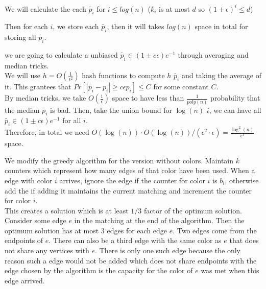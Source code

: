 \documentclass[11pt]{article}%
\begin{document}
\begin{questions}[1]
\begin{enumerate}
\begin{enumerate}
            We will calculate the each $\tilde{p_i}$ for $i \leq log(n)$ ($k_i$ is at most $d$ so $(1+\epsilon)^i\leq d$)
            
            Then for each $i$, we store each $\tilde{p_i}$, then it will takes $log(n)$ space in total for storing all $\tilde{p_i}$.
    
            we are going to calculate a unbiased $\tilde{p_i} \in (1\pm c\epsilon)e^{-1}$ through averaging and median tricks. \\
            
            We will use $h = O(\frac{1}{\epsilon^2})$ hash functions to compute $h$ $\tilde{p_i}$ and taking the average of it. This grantees that $Pr[|\tilde{p_i} - p_i|\geq c\epsilon p_i] \leq C$ for some constant $C$. \\
            
            By median tricks, we take $O(\frac{1}{\epsilon})$ space to have less than $\frac{1}{poly(n)}$ probability that the median $\tilde{p_i}$ is bad. Then, take the union bound for $\log(n)$ $i$, we can have all $\tilde{p_i} \in (1\pm c\epsilon)e^{-1}$ for all $i$.\\
            
            Therefore, in total we need $O(\log(n))\cdot O(\log(n))/(\epsilon^2\cdot\epsilon) = \frac{\log^2(n)}{\epsilon^3}$ space.
        \end{enumerate}
    \end{enumerate}
    \newpage
    We modify the greedy algorithm for the version without colors. Maintain $k$ counters which represent how many edges of that color have been used. When a edge with color $i$ arrives, ignore the edge if the counter for color $i$ is $b_i$, otherwise add the if adding it maintains the current matching and increment the counter for color $i$. \\
    This creates a solution which is at least $1/3$ factor of the optimum solution. Consider some edge $e$ in the matching at the end of the algorithm. Then the optimum solution has at most 3 edges for each edge $e$. Two edges come from the endpoints of $e$. There can also be a third edge with the same color as $e$ that does not share any vertices with $e$. There is only one such edge because the only reason such a edge would not be added which does not share endpoints with the edge chosen by the algorithm is the capacity for the color of $e$ was met when this edge arrived.  
    
    
\end{questions}
\end{document}
